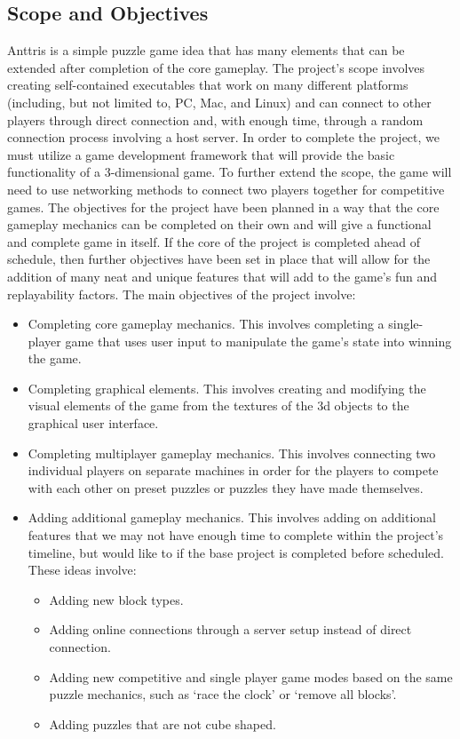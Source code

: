 \documentclass[12pt]{article}
\begin{document}
\subsection{Scope and Objectives}\label{scope-obj-CA}
Anttris is a simple puzzle game idea that has many elements that can be extended after completion of the core gameplay. The project's scope involves creating self-contained executables that work on many different platforms (including, but not limited to, PC, Mac, and Linux) and can connect to other players through direct connection and, with enough time, through a random connection process involving a host server. In order to complete the project, we must utilize a game development framework that will provide the basic functionality of a 3-dimensional game. To further extend the scope, the game will need to use networking methods to connect two players together for competitive games. The objectives for the project have been planned in a way that the core gameplay mechanics can be completed on their own and will give a functional and complete game in itself. If the core of the project is completed ahead of schedule, then further objectives have been set in place that will allow for the addition of many neat and unique features that will add to the game's fun and replayability factors. The main objectives of the project involve:
\begin{itemize}
 \item Completing core gameplay mechanics. This involves completing a single-player game that uses user input to manipulate the game's state into winning the game.
 \item Completing graphical elements. This involves creating and modifying the visual elements of the game from the textures of the 3d objects to the graphical user interface.
 \item Completing multiplayer gameplay mechanics. This involves connecting two individual players on separate machines in order for the players to compete with each other on preset puzzles or puzzles they have made themselves.
 \item Adding additional gameplay mechanics. This involves adding on additional features that we may not have enough time to complete within the project's timeline, but would like to if the base project is completed before scheduled. These ideas involve:
  \begin{itemize}
  \item Adding new block types.
  \item Adding online connections through a server setup instead of direct connection.
  \item Adding new competitive and single player game modes based on the same puzzle mechanics, such as ‘race the clock’ or ‘remove all blocks’.
  \item Adding puzzles that are not cube shaped.
  \end{itemize}
\end{itemize}
\end{document}

